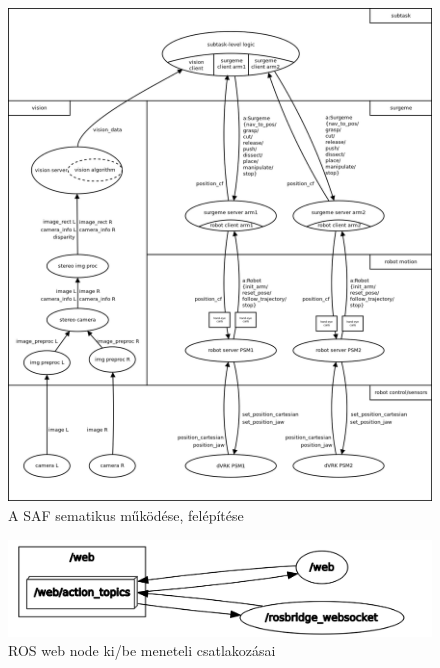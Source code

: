 \documentclass[12pt,a4paper,oneside]{report} %
\begin{document}
\begin{figure}[H]
	\label{fig:irob}
\begin{center}
	\includegraphics[width=14cm]{irobArch}
	\caption{A SAF sematikus működése, felépítése \cite{Abc-irobotics2020May} }
\end{center}
\end{figure}
\begin{figure}[H]
	\centering
	\label{fig:irob_web}
	\includegraphics[width=14cm]{irob_web}
	\caption{ROS web node ki/be meneteli csatlakozásai}
\end{figure}
\newpage
\end{document}
